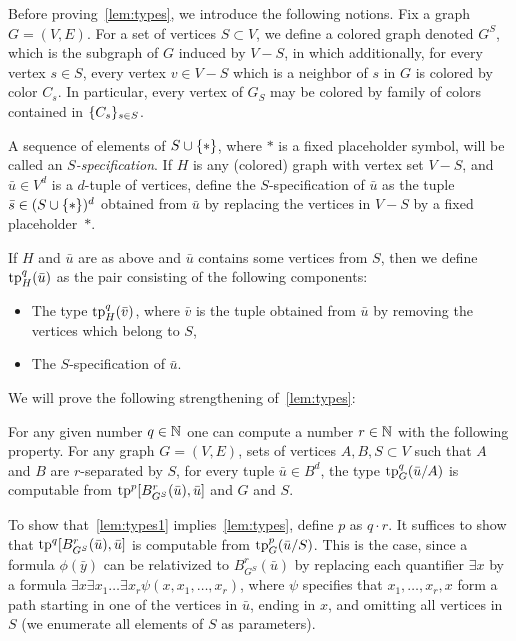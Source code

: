 Before proving~\cref{lem:types}, we introduce the following notions.
Fix a graph $G=(V,E)$.
For a set of vertices $S\subset V$,
we define a colored graph denoted $G^S$, which is 
the subgraph of $G$ induced by $V-S$,
in which additionally, for every vertex $s\in S$, every vertex $v\in V-S$ which is a neighbor of  $s$ in $G$ is colored by color $C_s$. In particular, every vertex of $G_S$
may be colored by family of colors contained in $\{C_s\}_{s\in S}$.

A sequence of elements of $S\cup\{\ast\}$,
where $\ast$ is a fixed placeholder symbol,
will be called an \emph{$S$-specification}.
If $H$ is any (colored) graph with vertex set $V-S$,
and $\bar u\in V^d$ is a $d$-tuple of vertices,
define the {$S$-specification} of $\bar u$
as the tuple $\bar s\in (S\cup\{\ast\})^d$ obtained from $\bar u$ by replacing the vertices in $V-S$ by a fixed placeholder~$\ast$.


If $H$ and $\bar u$ are as above and $\bar u$ contains some vertices from $S$,
then we define $\mathrm{tp}^q_H(\bar u)$ as the
pair consisting of the following components:
\begin{itemize}
	\item The type $\mathrm{tp}^q_H(\bar v)$,
	where $\bar v$ is the tuple obtained from $\bar u$
	by removing the vertices which belong to $S$,
	\item The $S$-specification of $\bar u$.
\end{itemize}

We will prove the following strengthening of~\cref{lem:types}:

\begin{lemma}\label{lem:types1}
For any given number $q\in\mathbb{N}$ one can compute 
 a number $r\in\mathbb{N}$ with the following property.
	For any graph $G=(V,E)$, sets of vertices $A,B,S\subset V$	
	such that $A$  and $B$ are $r$-separated by $S$,
	for every tuple $\bar u\in B^{d}$, 
	the type $\mathrm{tp}^q_G(\bar u/A)$
	is computable from  $\mathrm{tp}^{p}[B^r_{G^S}(\bar u), \bar u]$ and $G$ and $S$.  
\end{lemma}

To show that~\cref{lem:types1} implies~\cref{lem:types}, define $p$ as $q\cdot r$. It suffices to show that
$\mathrm{tp}^{q}[B^r_{G^S}(\bar u), \bar u]$ is computable from $\mathrm{tp}_G^p(\bar u/S)$. This is the case, since
a formula $\phi(\bar y)$
can be relativized to $B^r_{G^S}(\bar u)$
by replacing each quantifier $\exists x$ by a formula
$\exists x\exists x_1\ldots\exists x_r\psi (x,x_1,\ldots,x_r)$,
where $\psi$ specifies that $x_1,\ldots,x_r,x$ form a path
starting in one of the vertices in $\bar u$, ending in $x$,
and omitting all vertices in $S$ (we enumerate all elements of $S$ as parameters).


